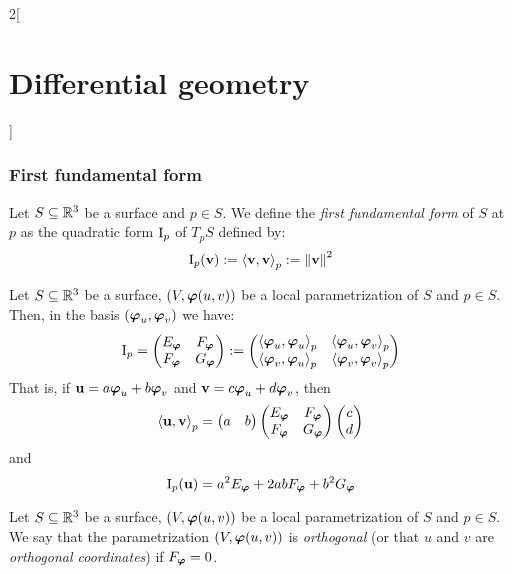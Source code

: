 \documentclass[../../../main.tex]{subfiles}
\begin{document}
\begin{multicols}{2}[\section{Differential geometry}]
  \subsubsection{First fundamental form}
  \begin{definition}
    Let $S\subseteq\mathbb{R}^3$ be a surface and $p\in S$. We define the \emph{first fundamental form} of $S$ at $p$ as the quadratic form $\mathrm{I}_p$ of $T_pS$ defined by:
    $$\mathrm{I}_p(\boldsymbol{\mathrm{v}}):={\langle\boldsymbol{\mathrm{v}},\boldsymbol{\mathrm{v}}\rangle}_p:={\|\boldsymbol{\mathrm{v}}\|}^2$$
  \end{definition}
  \begin{proposition}
    Let $S\subseteq\mathbb{R}^3$ be a surface, $(V,\boldsymbol{\mathrm{\varphi}}(u,v))$ be a local parametrization of $S$ and $p\in S$. Then, in the basis $(\boldsymbol{\mathrm{\varphi}}_u,\boldsymbol{\mathrm{\varphi}}_v)$ we have:
    $$
      \mathrm{I}_p=\begin{pmatrix}
        E_{\boldsymbol{\mathrm{\varphi}}} & F_{\boldsymbol{\mathrm{\varphi}}} \\
        F_{\boldsymbol{\mathrm{\varphi}}} & G_{\boldsymbol{\mathrm{\varphi}}}
      \end{pmatrix}:=\begin{pmatrix}
        {\langle\boldsymbol{\mathrm{\varphi}}_u,\boldsymbol{\mathrm{\varphi}}_u\rangle}_p & {\langle\boldsymbol{\mathrm{\varphi}}_u,\boldsymbol{\mathrm{\varphi}}_v\rangle}_p \\
        {\langle\boldsymbol{\mathrm{\varphi}}_v,\boldsymbol{\mathrm{\varphi}}_u\rangle}_p & {\langle\boldsymbol{\mathrm{\varphi}}_v,\boldsymbol{\mathrm{\varphi}}_v\rangle}_p
      \end{pmatrix}
    $$
    That is, if $\boldsymbol{\mathrm{u}}=a\boldsymbol{\mathrm{\varphi}}_u+b\boldsymbol{\mathrm{\varphi}}_v$ and $\boldsymbol{\mathrm{v}}=c\boldsymbol{\mathrm{\varphi}}_u+d\boldsymbol{\mathrm{\varphi}}_v$, then
    $${\langle\boldsymbol{\mathrm{u}},\boldsymbol{\mathrm{v}}\rangle}_p=\begin{pmatrix}
        a & b
      \end{pmatrix}\begin{pmatrix}
        E_{\boldsymbol{\mathrm{\varphi}}} & F_{\boldsymbol{\mathrm{\varphi}}} \\
        F_{\boldsymbol{\mathrm{\varphi}}} & G_{\boldsymbol{\mathrm{\varphi}}}
      \end{pmatrix}\begin{pmatrix}
        c \\
        d
      \end{pmatrix}$$
    and $$\mathrm{I}_p(\boldsymbol{\mathrm{u}})=a^2 E_{\boldsymbol{\mathrm{\varphi}}}+2ab F_{\boldsymbol{\mathrm{\varphi}}}+b^2G_{\boldsymbol{\mathrm{\varphi}}}$$
  \end{proposition}
  \begin{definition}
    Let $S\subseteq\mathbb{R}^3$ be a surface, $(V,\boldsymbol{\mathrm{\varphi}}(u,v))$ be a local parametrization of $S$ and $p\in S$. We say that the parametrization $(V,\boldsymbol{\mathrm{\varphi}}(u,v))$ is \emph{orthogonal} (or that $u$ and $v$ are \emph{orthogonal coordinates}) if $F_{\boldsymbol{\mathrm{\varphi}}}=0$.
  \end{definition}

\end{multicols}
\end{document}
